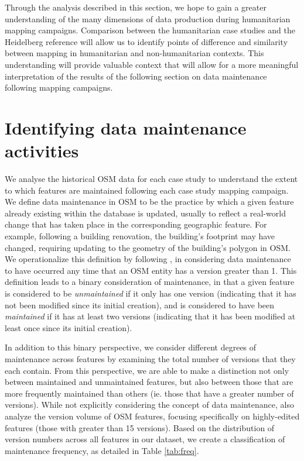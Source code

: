 Through the analysis described in this section, we hope to gain a greater understanding of the many dimensions of data production during humanitarian mapping campaigns. Comparison between the humanitarian case studies and the Heidelberg reference will allow us to identify points of difference and similarity between mapping in humanitarian and non-humanitarian contexts. This understanding will provide valuable context that will allow for a more meaningful interpretation of the results of the following section on data maintenance following mapping campaigns.

\section{Identifying data maintenance activities}
\label{sec-maint}

We analyse the historical OSM data for each case study to understand the extent to which features are maintained following each case study mapping campaign. We define data maintenance in OSM to be the practice by which a given feature already existing within the database is updated, usually to reflect a real-world change that has taken place in the corresponding geographic feature.  For example, following a building renovation, the building's footprint may have changed, requiring updating to the geometry of the building's polygon in OSM. 
We operationalize this definition by following \textcite{quattrone_work_2017}, in considering data maintenance to have occurred any time that an OSM entity has a version greater than 1. This definition leads to a binary consideration of maintenance, in that a given feature is considered to be \textit{unmaintained} if it only has one version (indicating that it has not been modified since its initial creation), and is considered to have been \textit{maintained} if it has at least two versions (indicating that it has been modified at least once since its initial creation).  

In addition to this binary perspective, we consider different degrees of maintenance across features by examining the total number of versions that they each contain. From this perspective, we are able to make a distinction not only between maintained and unmaintained features, but also between those that are more frequently maintained than others (ie. those that have a greater number of versions). While not explicitly considering the concept of data maintenance, \textcite{mooney_characteristics_2012} also analyze the version volume of OSM features, focusing specifically on highly-edited features (those with greater than 15 versions). Based on the distribution of version numbers across all features in our dataset, we create a classification of maintenance frequency, as detailed in Table \ref{tab:freq}. 

